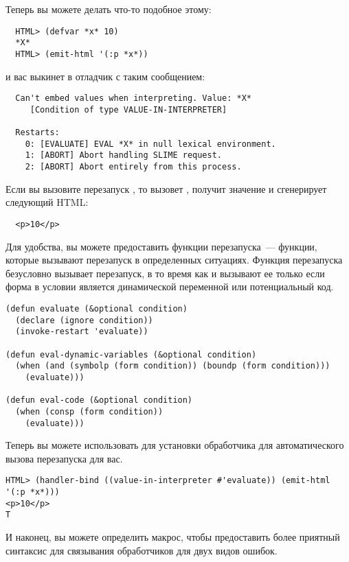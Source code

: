 Теперь вы можете делать что-то подобное этому:

\begin{verbatim}
  HTML> (defvar *x* 10)
  *X*
  HTML> (emit-html '(:p *x*))
\end{verbatim}

и вас выкинет в отладчик с таким сообщением:

\begin{verbatim}
  Can't embed values when interpreting. Value: *X*
     [Condition of type VALUE-IN-INTERPRETER]

  Restarts:
    0: [EVALUATE] EVAL *X* in null lexical environment.
    1: [ABORT] Abort handling SLIME request.
    2: [ABORT] Abort entirely from this process.
\end{verbatim}

Если вы вызовите перезапуск , то  вызовет , получит значение  и сгенерирует следующий HTML:

\begin{verbatim}
  <p>10</p>
\end{verbatim}

Для удобства, вы можете предоставить функции перезапуска~--- функции, которые вызывают
 перезапуск в определенных ситуациях. Функция  перезапуска
безусловно вызывает перезапуск, в то время как  и
 вызывают ее только если форма в условии является динамической переменной
или потенциальный код.

\begin{lstlisting}
(defun evaluate (&optional condition)
  (declare (ignore condition))
  (invoke-restart 'evaluate))

(defun eval-dynamic-variables (&optional condition)
  (when (and (symbolp (form condition)) (boundp (form condition)))
    (evaluate)))

(defun eval-code (&optional condition)
  (when (consp (form condition))
    (evaluate)))
\end{lstlisting}

Теперь вы можете использовать  для установки обработчика для
автоматического вызова  перезапуска для вас.

\begin{lstlisting}
HTML> (handler-bind ((value-in-interpreter #'evaluate)) (emit-html '(:p *x*)))
<p>10</p>
T
\end{lstlisting}

И наконец, вы можете определить макрос, чтобы предоставить более приятный синтаксис для
связывания обработчиков для двух видов ошибок.

